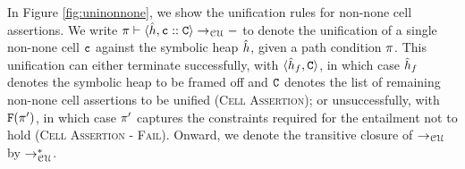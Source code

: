 In Figure \ref{fig:uninonnone}, we show the unification rules for non-none cell assertions. 
We write $\pi \vdash \langle \hat{h}, \mathtt{c} :: \mathtt{C} \rangle \rightarrow_{\cal CU} -$ to denote the unification of a single non-none cell $\mathtt{c}$ against the symbolic heap $\hat{h}$, given a path condition $\pi$. This unification can either terminate
successfully, with $\langle \hat{h}_f, \mathtt{C} \rangle$, in which case $\hat{h}_f$ denotes the
symbolic heap to be framed off and $\mathtt{C}$ denotes the list of remaining non-none cell assertions to be unified (\textsc{Cell Assertion}); or unsuccessfully, with ${\mathtt{F}}(\pi')$, 
in which case $\pi'$ captures the constraints required for the entailment not to hold (\textsc{Cell Assertion - Fail}).
%   
Onward, we denote the transitive closure of $\rightarrow_{\cal CU}$ by $\rightarrow_{\cal CU}^*$. 

